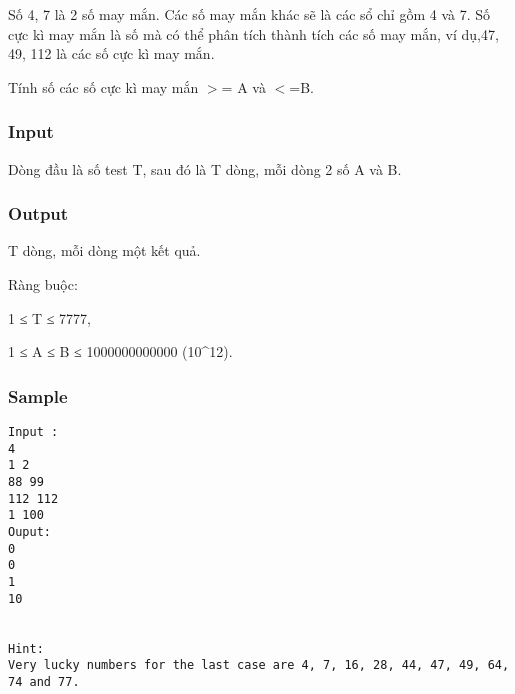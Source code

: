 



   Số 4, 7 là 2 số may mắn. Các số may mắn khác sẽ là các sổ chỉ gồm 4 và 7.  Số cực kì may mắn là số mà có thể phân tích thành tích các số may mắn,  ví dụ,47, 49, 112 là các số cực kì may mắn.  

   Tính số các số cực kì may mắn $>$= A và $<$=B.  



\subsubsection{   Input  }



   Dòng đầu là số test T, sau đó là T dòng, mỗi dòng 2 số A và B.  



\subsubsection{   Output  }



   T dòng, mỗi dòng một kết quả.  

   Ràng buộc:  

   1 ≤ T ≤ 7777,  

   1 ≤ A ≤ B ≤ 1000000000000 (10\textasciicircum12).  



\subsubsection{   Sample  }
\begin{verbatim}
Input :
4 
1 2 
88 99 
112 112 
1 100 
Ouput: 
0 
0 
1 
10 

 
Hint: 
Very lucky numbers for the last case are 4, 7, 16, 28, 44, 47, 49, 64, 74 and 77. 
\end{verbatim}